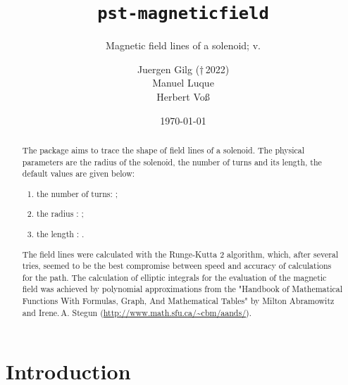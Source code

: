 \documentclass[11pt,english,bibliography=totoc,parskip=false,headings=small,usegeometry,]{pst-doc}
\let\pstMFfv\fileversion
\begin{document}
\title{\texttt{pst-magneticfield}}
\subtitle{Magnetic field lines of a solenoid; v.\pstMFfv}
\author{Juergen Gilg (†\,2022)\\ Manuel Luque\\Herbert Vo\ss}
\docauthor{}
\date{\today}
\settitle


\clearpage%
\begin{abstract}
The package  aims to trace the shape of field lines
of a solenoid. The physical parameters are the radius of the solenoid, the number of
turns and its length, the default values are given below:

\begin{enumerate}
  \item the number of turns:  ;
  \item the radius :  ;
  \item the length : .
\end{enumerate}

The field lines were calculated with the Runge-Kutta 2 algorithm, which, after several tries, 
seemed to be the best compromise between speed and accuracy of calculations for the path.
The calculation of elliptic integrals for the evaluation of the magnetic field
was achieved by polynomial approximations from the "Handbook of Mathematical
Functions With Formulas, Graph, And Mathematical Tables" by Milton Abramowitz and
Irene.\,A. Stegun (\url{http://www.math.sfu.ca/~cbm/aands/}).~\cite{abramowitz}
\end{abstract}

\clearpage
\tableofcontents


\clearpage

\section{Introduction}
\end{document}
